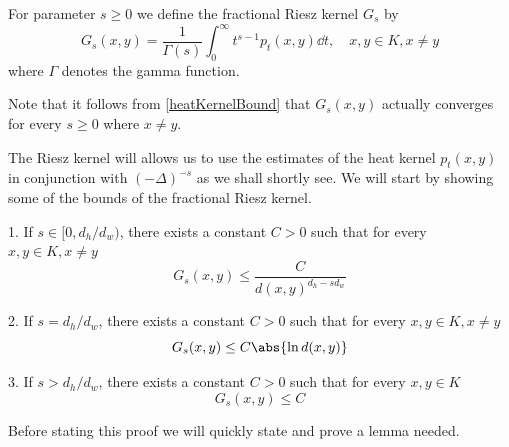\begin{defi}\label{fractionalRieszKernel}
	For parameter $s \geq 0$ we define the fractional Riesz kernel $G_s$ by
	\begin{equation}
		G_{s}(x,y) = \frac{1}{\Gamma(s)}\int_{0}^{\infty} t^{s-1}p_t(x,y) \dd t, \quad x, y \in K, x \neq y
	\end{equation}
	where $\Gamma$ denotes the gamma function.
\end{defi}
\begin{remark*}
	Note that it follows from \eqref{heatKernelBound} that $G_s(x,y)$ actually converges for every $s \geq 0$ where $x \neq y$.
\end{remark*}
The Riesz kernel will allows us to use the estimates of the heat kernel $p_t(x,y)$ in conjunction with $(-\Delta)^{-s}$ as we shall shortly see. We will start by showing some of the bounds of the fractional Riesz kernel. 
\begin{prop}
	\begin{enumerate}\label{boundsOfRieszKernel}
		1. If $s \in [0, d_h/d_w)$, there exists a constant $C > 0$ such that for every $x,y \in K, x \neq y$
		\begin{equation}
			G_s(x,y) \leq \frac{C}{d(x,y)^{d_h-sd_w}}
		\end{equation}
		
		2. If $s = d_h/d_w$, there exists a constant $C > 0$ such that for every $x,y \in K, x \neq y$
			\begin{equation}
				G_s(x,y) \leq C \abs{\ln d(x,y)}
			\end{equation}
			
		3. If $s > d_h/d_w$, there exists a constant $C > 0$ such that for every $x,y \in K$
		\begin{equation}
			G_s(x,y) \leq C 
		\end{equation}
	\end{enumerate}
\end{prop}
Before stating this proof we will quickly state and prove a lemma needed.

